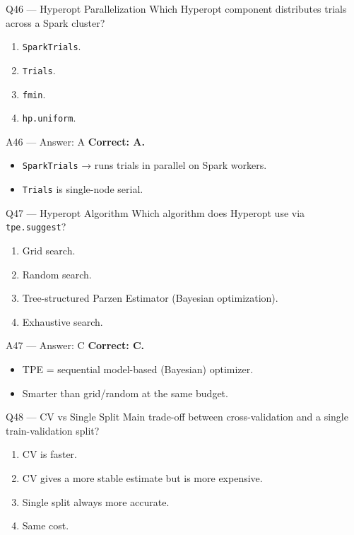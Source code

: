 \documentclass[aspectratio=169,10pt]{beamer}
\begin{document}
	\begin{frame}{Q46 — Hyperopt Parallelization}
		Which Hyperopt component distributes trials across a Spark cluster?
		\begin{enumerate}[label=\Alph*.]
			\item \texttt{SparkTrials}.
			\item \texttt{Trials}.
			\item \texttt{fmin}.
			\item \texttt{hp.uniform}.
		\end{enumerate}
	\end{frame}
	
	\begin{frame}{A46 — Answer: A}
		\textbf{Correct: A.}
		\begin{itemize}
			\item \texttt{SparkTrials} → runs trials in parallel on Spark workers.
			\item \texttt{Trials} is single-node serial.
		\end{itemize}
	\end{frame}
	
	\begin{frame}{Q47 — Hyperopt Algorithm}
		Which algorithm does Hyperopt use via \texttt{tpe.suggest}?
		\begin{enumerate}[label=\Alph*.]
			\item Grid search.
			\item Random search.
			\item Tree-structured Parzen Estimator (Bayesian optimization).
			\item Exhaustive search.
		\end{enumerate}
	\end{frame}
	
	\begin{frame}{A47 — Answer: C}
		\textbf{Correct: C.}
		\begin{itemize}
			\item TPE = sequential model-based (Bayesian) optimizer.
			\item Smarter than grid/random at the same budget.
		\end{itemize}
	\end{frame}
	
	\begin{frame}{Q48 — CV vs Single Split}
		Main trade-off between cross-validation and a single train-validation split?
		\begin{enumerate}[label=\Alph*.]
			\item CV is faster.
			\item CV gives a more stable estimate but is more expensive.
			\item Single split always more accurate.
			\item Same cost.
		\end{enumerate}
	\end{frame}
	
\end{document}
